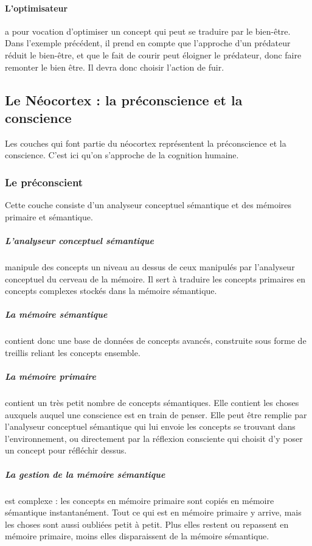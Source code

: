 \paragraph {L’optimisateur} a pour vocation d’optimiser un concept qui peut
se traduire par le bien-être. Dans l’exemple précédent, il prend en compte que l’approche d’un
prédateur réduit le bien-être, et que le fait de courir peut éloigner le
prédateur, donc faire remonter le bien être. Il devra donc choisir l’action de
fuir.

\subsection{Le Néocortex : la préconscience et la conscience}
Les couches qui font partie du néocortex représentent la préconscience et la
conscience. C'est ici qu'on s'approche de la cognition humaine.
\subsubsection{Le préconscient} Cette couche consiste d'un analyseur
conceptuel sémantique et des mémoires primaire et sémantique.
\subparagraph{L'analyseur conceptuel sémantique} manipule des concepts un niveau
au dessus de ceux manipulés par l’analyseur conceptuel du cerveau de la mémoire. Il sert à
traduire les concepts primaires en concepts complexes stockés dans la mémoire
sémantique.
\subparagraph{La mémoire sémantique} contient donc une base de
données de concepts avancés, construite sous forme de treillis reliant les
concepts ensemble.
\subparagraph{La mémoire primaire} contient un très petit nombre de concepts
sémantiques. Elle contient les choses auxquels auquel une conscience est en
train de penser. Elle peut être remplie par l’analyseur conceptuel sémantique qui lui envoie les
concepts se trouvant dans l’environnement, ou directement par la réflexion
consciente qui choisit d’y poser un concept pour réfléchir dessus.
\subparagraph{La gestion de la mémoire sémantique} est complexe : les concepts
en mémoire primaire sont copiés en mémoire sémantique instantanément. Tout ce qui est en
mémoire primaire y arrive, mais les choses sont aussi oubliées petit à petit.
Plus elles restent ou repassent en mémoire primaire, moins elles disparaissent
de la mémoire sémantique.
